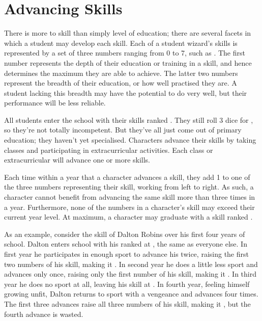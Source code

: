 \section{Advancing Skills}

There is more to skill than simply level of education; there are several facets in which a student may develop each skill.
Each of a student wizard's skills is represented by a set of three numbers ranging from 0 to 7, such as .
The first number represents the depth of their education or training in a skill, and hence determines the maximum they are able to achieve.
The latter two numbers represent the breadth of their education, or how well practised they are.
A student lacking this breadth may have the potential to do very well, but their performance will be less reliable.

All students enter the school with their skills ranked .
They still roll 3 dice for {\tests}, so they're not totally incompetent.
But they've all just come out of primary education; they haven't yet specialised.
Characters advance their skills by taking classes and participating in extracurricular activities.
Each class or extracurricular will advance one or more skills.

Each time within a year that a character advances a skill, they add 1 to one of the three numbers representing their skill, working from left to right.
As such, a character cannot benefit from advancing the same skill more than three times in a year.
Furthermore, none of the numbers in a character's skill may exceed their current year level.
At maximum, a character may graduate with a skill ranked .

As an example, consider the  skill of Dalton Robins over his first four years of school.
Dalton enters school with his  ranked at , the same as everyone else.
In first year he participates in enough sport to advance his  twice, raising the first two numbers of his skill, making it .
In second year he does a little less sport and advances  only once, raising only the first number of his skill, making it .
In third year he does no sport at all, leaving his skill at .
In fourth year, feeling himself growing unfit, Dalton returns to sport with a vengeance and advances  four times.
The first three advances raise all three numbers of his skill, making it , but the fourth advance is wasted.

